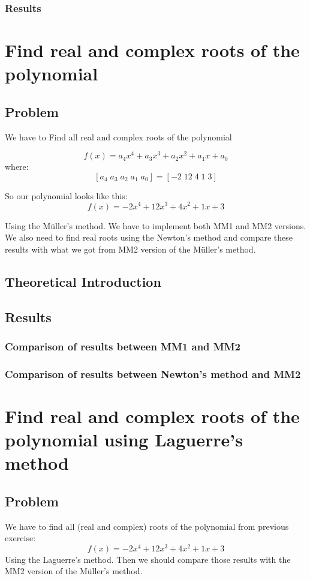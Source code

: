 \documentclass[12pt]{report}
\begin{document}
\subsection{Results}


\chapter{Find real and complex roots of the polynomial}

\section{Problem}

We have to Find all real and complex roots of the polynomial

\[ f(x) = a_4x^4+a_3x^3+a_2x^2+a_1x+a_0 \]
where:
\[ [a_4 \; a_3 \; a_2 \; a_1 \; a_0] = [-2 \; 12 \; 4 \; 1 \; 3] \]

So our polynomial looks like this:
\[ f(x) = -2x^4+12x^3+4x^2+1x+3 \]

Using the M{\"u}ller's method. We have to implement both MM1 and MM2 versions. We also need to find real roots using the Newton's method and compare these results with what we got from MM2 version of the M{\"u}ller's method.
\section{Theoretical Introduction}
\section{Results}

\subsection{Comparison of results between MM1 and MM2}
\subsection{Comparison of results between Newton's method and MM2}

\chapter{Find real and complex roots of the polynomial using Laguerre's method}

\section{Problem}
We have to find all (real and complex) roots of the polynomial from previous exercise:
\[ f(x) = -2x^4+12x^3+4x^2+1x+3 \]
Using the Laguerre's method. Then we should compare those results with the MM2 version of the  M{\"u}ller's method.
\end{document}
